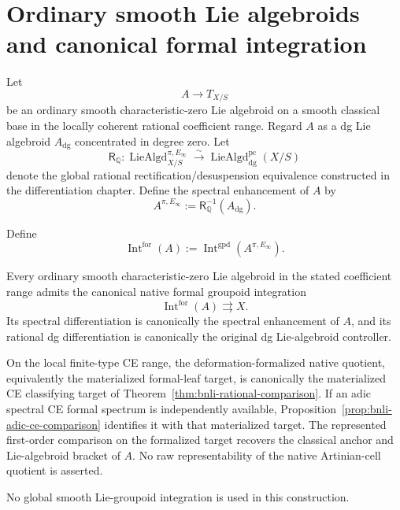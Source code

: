 \section{Ordinary smooth Lie algebroids and canonical formal integration}
\label{sec:bnli-classical-formal-integration}

Let
\[
    A\longrightarrow T_{X/S}
\]
be an ordinary smooth characteristic-zero Lie algebroid on a smooth classical
base in the locally coherent rational coefficient range.  Regard $A$ as a dg
Lie algebroid $A_{\mathrm{dg}}$ concentrated in degree zero.  Let
\[
    \mathsf R_{\mathbb Q}:
    \operatorname{LieAlgd}^{\pi,E_\infty}_{X/S}
    \xrightarrow{\sim}
    \operatorname{LieAlgd}^{\mathrm{pc}}_{\mathrm{dg}}(X/S)
\]
denote the global rational rectification/desuspension equivalence constructed
in the differentiation chapter.  Define the spectral enhancement of $A$ by
\[
\boxed{
    A^{\pi,E_\infty}
    :=
    \mathsf R_{\mathbb Q}^{-1}(A_{\mathrm{dg}}).}
\]

\begin{definition}
\label{def:bnli-classical-formal-integration}
Define
\[
\boxed{
    \operatorname{Int}^{\mathrm{for}}(A)
    :=
    \operatorname{Int}^{\mathrm{gpd}}
    \left(
      A^{\pi,E_\infty}
    \right).}
\]
\end{definition}

\begin{theorem}
\label{thm:bnli-classical-formal-integration}
Every ordinary smooth characteristic-zero Lie algebroid in the stated
coefficient range admits the canonical native formal groupoid integration
\[
    \operatorname{Int}^{\mathrm{for}}(A)
    \rightrightarrows X.
\]
Its spectral differentiation is canonically the spectral enhancement of
\(A\), and its rational dg differentiation is canonically the original dg
Lie-algebroid controller.

On the local finite-type CE range, the deformation-formalized native quotient,
equivalently the materialized formal-leaf target, is canonically the
materialized CE classifying target of
Theorem~\ref{thm:bnli-rational-comparison}.  If an adic spectral CE formal
spectrum is independently available, Proposition~\ref{prop:bnli-adic-ce-comparison}
identifies it with that materialized target.  The represented first-order
comparison on the formalized target recovers the classical anchor and
Lie-algebroid bracket of \(A\).  No raw representability of the native
Artinian-cell quotient is asserted.

No global smooth Lie-groupoid integration is used in this construction.
\end{theorem}

